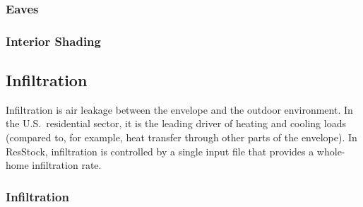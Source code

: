 \subsubsection{Eaves}\label{eaves}


\subsubsection{Interior Shading}\label{interior_shading}


\subsection{Infiltration}
Infiltration is air leakage between the envelope and the outdoor environment. In the U.S.~residential sector, it is the leading driver of heating and cooling loads (compared to, for example, heat transfer through other parts of the envelope). In ResStock, infiltration is controlled by a single input file that provides a whole-home infiltration rate.

\subsubsection{Infiltration}\label{infiltration}

